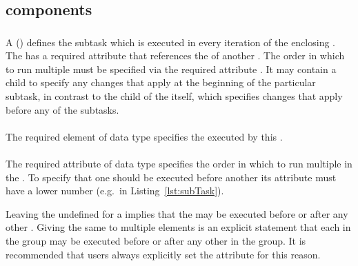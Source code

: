 \subsection{ components}
\label{class:taskComponents}

\subsubsection{}
\label{class:subTask}
A  () defines the subtask which is executed in every iteration of the enclosing \RepeatedTask. The  has a required attribute \hyperref[sec:subTaskTask]{} that references the \hyperref[sec:id]{} of another \AbstractTask. The order in which to run multiple  must be specified via the required attribute \hyperref[sec:subTaskOrder]{}.  It may contain a child \ListOfChanges to specify any changes that apply at the beginning of the particular subtask, in contrast to the \ListOfChanges child of the \RepeatedTask itself, which specifies changes that apply before any of the subtasks.

\paragraph*{}
\label{sec:subTaskTask}
The required element  of data type \SIdRef specifies the \AbstractTask executed by this \SubTask.

\paragraph*{}
\label{sec:subTaskOrder}
The required attribute  of data type  specifies the order in which to run multiple  in the \hyperref[class:listOfSubTasks]{}. To specify that one  should be executed before another its  attribute must have a lower number (e.g.\ in Listing~\ref{lst:subTask}).

Leaving the  undefined for a \SubTask implies that the \SubTask may be executed before or after any other \SubTask.  Giving the same  to multiple \SubTask elements is an explicit statement that each \SubTask in the group may be executed before or after any other \SubTask in the group. It is recommended that users always explicitly set the  attribute for this reason.

